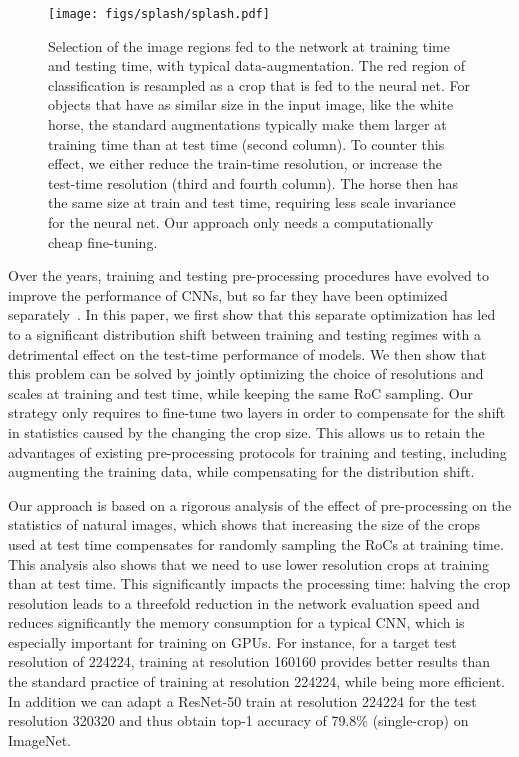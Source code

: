 \documentclass{article}
\begin{document}
\begin{figure*}[t]
\centering \texttt{[image: figs/splash/splash.pdf]}

\caption{\label{fig:traintestaug}
Selection of the image regions fed to the network at training time and testing time, with typical data-augmentation.
The red region of classification is resampled as a crop that is fed to the neural net.
For objects that have as similar size in the input image, like the white horse, the standard augmentations typically make them larger at training time than at test time (second column). 
To counter this effect, we either reduce the train-time resolution, or increase the test-time resolution (third and fourth column). The horse then has the same size at train and test time, requiring less scale invariance for the neural net. 
Our approach only needs a computationally cheap fine-tuning. }
\vspace{-0.2em}
\end{figure*} 
Over the years, training and testing pre-processing procedures have evolved to improve the performance of CNNs, but so far they have been optimized separately~\cite{Ekin2018AutoAugment}.
In this paper, we first show that this separate optimization has led to a significant distribution shift between training and testing regimes with a detrimental effect on the test-time performance of models.
We then show that this problem can be solved by jointly optimizing the choice of resolutions and scales at training and test time, while keeping the same RoC sampling.
Our strategy only requires to fine-tune two layers in order to compensate for the shift in statistics caused by the changing the crop size.
This allows us to retain the advantages of existing pre-processing protocols for training and testing, including augmenting the training data, while compensating for the distribution shift.

Our approach is based on a rigorous analysis of the effect of pre-processing on the statistics of natural images, which shows that increasing the size of the crops used at test time compensates for randomly sampling the RoCs at training time. 
This analysis also shows that we need to use lower resolution crops at training than at test time. 
This significantly impacts the processing time: halving the crop resolution leads to a threefold reduction in the network evaluation speed and reduces significantly the memory consumption for a typical CNN, which is especially important for training on GPUs.
For instance, for a target test resolution of 224224, training at resolution 160160 provides better results than the standard practice of training at resolution 224224, while being more efficient. 
In addition we can adapt a ResNet-50 train at resolution 224224 for the test resolution 320320 and thus obtain top-1 accuracy of 79.8\% (single-crop) on ImageNet. 
\end{document}
